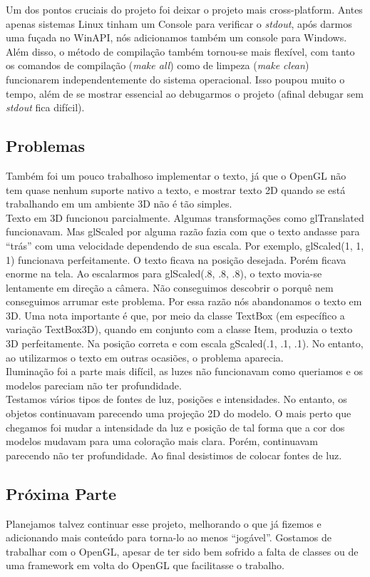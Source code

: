 \documentclass[12pt,a4paper]{article}
\begin{document}
        Um dos pontos cruciais do projeto foi deixar o projeto mais cross-platform. Antes apenas sistemas Linux tinham um Console para verificar o \emph{stdout}, após darmos uma fuçada no WinAPI, nós adicionamos também um console para Windows. Além disso, o método de compilação também tornou-se mais flexível, com tanto os comandos de compilação (\emph{make all}) como de limpeza (\emph{make clean}) funcionarem independentemente do sistema operacional. Isso poupou muito o tempo, além de se mostrar essencial ao debugarmos o projeto (afinal debugar sem \emph{stdout} fica difícil).
    
    \subsection{Problemas}     
        Também foi um pouco trabalhoso implementar o texto, já que o OpenGL não tem quase nenhum suporte nativo a texto, e mostrar texto 2D quando se está trabalhando em um ambiente 3D não é tão simples. \\

        Texto em 3D funcionou parcialmente. Algumas transformações como glTranslated funcionavam. Mas glScaled por alguma razão fazia com que o texto andasse para ``trás'' com uma velocidade dependendo de sua escala. Por exemplo, glScaled(1, 1, 1) funcionava perfeitamente. O texto ficava na posição desejada. Porém ficava enorme na tela. Ao escalarmos para glScaled(.8, .8, .8), o texto movia-se lentamente em direção a câmera. Não conseguimos descobrir o porquê nem conseguimos arrumar este problema. Por essa razão nós abandonamos o texto em 3D. Uma nota importante é que, por meio da classe TextBox (em específico a variação TextBox3D), quando em conjunto com a classe Item, produzia o texto 3D perfeitamente. Na posição correta e com escala gScaled(.1, .1, .1). No entanto, ao utilizarmos o texto em outras ocasiões, o problema aparecia. \\

        Iluminação foi a parte mais difícil, as luzes não funcionavam como queriamos e os modelos pareciam não ter profundidade. \\

        Testamos vários tipos de fontes de luz, posições e intensidades. No entanto, os objetos continuavam parecendo uma projeção 2D do modelo. O mais perto que chegamos foi mudar a intensidade da luz e posição de tal forma que a cor dos modelos mudavam para uma coloração mais clara. Porém, continuavam parecendo não ter profundidade. Ao final desistimos de colocar fontes de luz.\\
    
    \subsection{Próxima Parte}
      	Planejamos talvez continuar esse projeto, melhorando o que já fizemos e adicionando mais conteúdo para torna-lo ao menos ``jogável''. Gostamos de trabalhar com o OpenGL, apesar de ter sido bem sofrido a falta de classes ou de uma framework em volta do OpenGL que facilitasse o trabalho.
\end{document}
